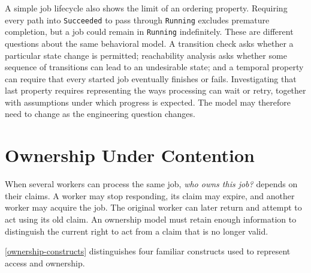 A simple job lifecycle also shows the limit of an ordering property. Requiring every path into \texttt{Succeeded} to pass through \texttt{Running} excludes premature completion, but a job could remain in \texttt{Running} indefinitely. These are different questions about the same behavioral model. A transition check asks whether a particular state change is permitted; reachability analysis asks whether some sequence of transitions can lead to an undesirable state; and a temporal property can require that every started job eventually finishes or fails. Investigating that last property requires representing the ways processing can wait or retry, together with assumptions under which progress is expected. The model may therefore need to change as the engineering question changes.

\section{Ownership Under Contention}\label{heading:ownership-under-contention}


When several workers can process the same job, \emph{who owns this job?} depends on their claims. A worker may stop responding, its claim may expire, and another worker may acquire the job. The original worker can later return and attempt to act using its old claim. An ownership model must retain enough information to distinguish the current right to act from a claim that is no longer valid.

\autoref{ownership-constructs} distinguishes four familiar constructs used to represent access and ownership.

